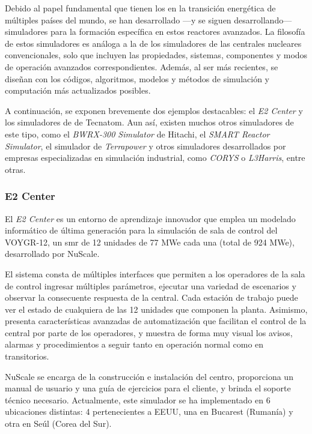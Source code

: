 Debido al papel fundamental que tienen los  en la transición energética de múltiples países del mundo, se han desarrollado ---y se siguen desarrollando--- simuladores para la formación específica en estos reactores avanzados. La filosofía de estos simuladores es análoga a la de los simuladores de las centrales nucleares convencionales, solo que incluyen las propiedades, sistemas, componentes y  modos de operación avanzados correspondientes. Además, al ser más recientes, se diseñan con los códigos, algoritmos, modelos y métodos de simulación y computación más actualizados posibles. 

A continuación, se exponen brevemente dos ejemplos destacables: el \textit{E2 Center} y los simuladores de  de Tecnatom. Aun así, existen muchos otros simuladores de este tipo, como el \textit{BWRX-300 Simulator} de Hitachi, el \textit{SMART Reactor Simulator}, el simulador de \textit{Terrapower} y otros simuladores desarrollados por empresas especializadas en simulación industrial, como \textit{CORYS} o \textit{L3Harris}, entre otras.

\subsubsection{E2 Center}

El \textit{E2 Center} es un entorno de aprendizaje innovador que emplea un modelado informático de última generación para la simulación de sala de control del VOYGR-12, un \acrlong{smr} de 12 unidades de 77 MWe cada una (total de 924 MWe), desarrollado por NuScale.

El sistema consta de múltiples interfaces que permiten a los operadores de la sala de control ingresar múltiples parámetros, ejecutar una variedad de escenarios y observar la consecuente respuesta de la central. Cada estación de trabajo puede ver el estado de cualquiera de las 12 unidades que componen la planta. Asimismo, presenta características avanzadas de automatización que facilitan el control de la central por parte de los operadores, y muestra de forma muy visual los avisos, alarmas y procedimientos a seguir tanto en operación normal como en transitorios.

NuScale se encarga de la construcción e instalación del centro, proporciona un manual de usuario y una guía de ejercicios para el cliente, y brinda el soporte técnico necesario. Actualmente, este simulador se ha implementado en 6 ubicaciones distintas: 4 pertenecientes a EEUU, una en Bucarest (Rumanía) y otra en Seúl (Corea del Sur).

